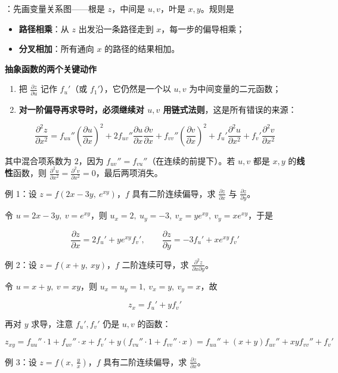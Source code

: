 \documentclass[11pt,openany,UTF8]{ctexbook}
\begin{document}
：先画变量关系图——根是 $z$，中间是 $u,v$，叶是 $x,y$。规则是

\begin{itemize}
\item \textbf{路径相乘}：从 $z$ 出发沿一条路径走到 $x$，每一步的偏导相乘；
\item \textbf{分叉相加}：所有通向 $x$ 的路径的结果相加。
\end{itemize}
\textbf{抽象函数的两个关键动作}

\begin{enumerate}
\item 把 $\frac{\partial z}{\partial u}$ 记作 $f_u'$（或 $f_1'$），它仍然是一个以 $u,v$ 为中间变量的二元函数；
\item \textbf{对一阶偏导再求导时，必须继续对 $u,v$ 用链式法则}，这是所有错误的来源：
\end{enumerate}
\[\frac{\partial^{2}z}{\partial x^{2}}=f_{uu}''\left(\frac{\partial u}{\partial x}\right)^{2}+2f_{uv}''\frac{\partial u}{\partial x}\frac{\partial v}{\partial x}+f_{vv}''\left(\frac{\partial v}{\partial x}\right)^{2}+f_u'\frac{\partial^{2}u}{\partial x^{2}}+f_v'\frac{\partial^{2}v}{\partial x^{2}}\]

其中混合项系数为 $2$，因为 $f_{uv}''=f_{vu}''$（在连续的前提下）。若 $u,v$ 都是 $x,y$ 的\textbf{线性}函数，则 $\frac{\partial^{2}u}{\partial x^{2}}=\frac{\partial^{2}v}{\partial x^{2}}=0$，最后两项消失。

例 1：设 $z=f(2x-3y,\ e^{xy})$，$f$ 具有二阶连续偏导，求 $\frac{\partial z}{\partial x}$ 与 $\frac{\partial z}{\partial y}$。

令 $u=2x-3y,\ v=e^{xy}$，则 $u_x=2,\ u_y=-3,\ v_x=ye^{xy},\ v_y=xe^{xy}$，于是

\[\frac{\partial z}{\partial x}=2f_u'+ye^{xy}f_v',\qquad \frac{\partial z}{\partial y}=-3f_u'+xe^{xy}f_v'\]

例 2：设 $z=f(x+y,\ xy)$，$f$ 二阶连续可导，求 $\frac{\partial^{2}z}{\partial x\partial y}$。

令 $u=x+y,\ v=xy$，则 $u_x=u_y=1,\ v_x=y,\ v_y=x$，故

\[z_x=f_u'+yf_v'\]

再对 $y$ 求导，注意 $f_u',f_v'$ 仍是 $u,v$ 的函数：

\[z_{xy}=f_{uu}''\cdot 1+f_{uv}''\cdot x+f_v'+y\left(f_{vu}''\cdot 1+f_{vv}''\cdot x\right)=f_{uu}''+(x+y)f_{uv}''+xyf_{vv}''+f_v'\]

例 3：设 $z=f\left(x,\ \frac yx\right)$，$f$ 具有二阶连续偏导，求 $\frac{\partial z}{\partial x}$。
\end{document}
